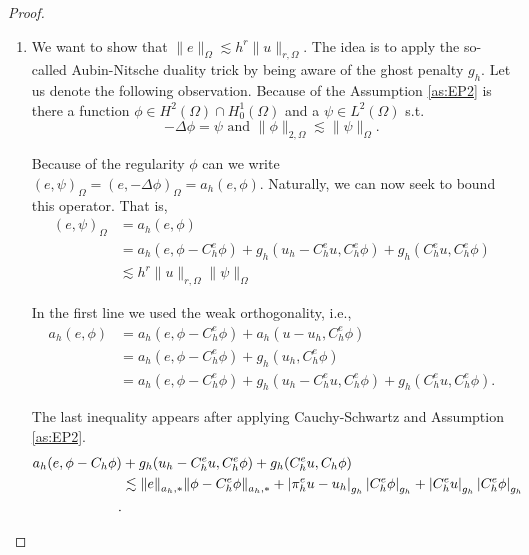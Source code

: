 \begin{proof}
\begin{enumerate}[label=\arabic*)]
    \item We want to show that $ \| e \|_{ \Omega  }^{  } \lesssim   h^{r} \| u \|_{ r,\Omega  }^{  }$. The idea is to apply the so-called Aubin-Nitsche duality trick by being aware of the ghost penalty $g_{h}$. Let us denote the following observation.
    Because of the Assumption \ref{as:EP2} is there a function $\phi \in H^2( \Omega ) \cap H^{1}_{0}( \Omega ) $ and a $\psi \in L^2( \Omega )  $ s.t.
    $$-\Delta \phi = \psi  \text{ and }  \| \phi  \|_{ 2, \Omega  }^{  } \lesssim \| \psi  \|_{ \Omega  }^{  }.$$

    Because of the regularity $\phi $ can we write $ (e, \psi  )_{\Omega } = (e, -\Delta \phi )_{\Omega } = a_{h}(e, \phi )  $. Naturally, we can now seek to bound this operator. That is,
    \[
    \begin{split}
        (e, \psi  )_{\Omega } &= a_{h}( e, \phi ) \\
        &= a_{h}(e, \phi -  C_{h}^{e} \phi   ) + g_{h}(u_{h} - C_{h}^{e} u,   C^{e}_{h} \phi   )  +g_{h}(C^{e} _{h} u, C_{h}^{e} \phi   ) \\
        & \lesssim h^{r} \| u \|_{ r, \Omega  }^{  } \| \psi  \|_{ \Omega  }^{  }
    \end{split}
    \]

    In the first line we used the weak orthogonality, i.e.,
    \[
        \begin{split}
    a_{h}( e, \phi ) & = a_{h}( e, \phi  - C^{e} _{h} \phi ) + a_{h}( u - u_{h}, C^{e} _{h} \phi ) \\
     & = a_{h}( e, \phi  - C^{e} _{h} \phi ) + g_{h}(  u_{h}, C^{e} _{h} \phi ) \\
     & = a_{h}( e, \phi  - C^{e} _{h} \phi ) + g_{h}(  u_{h} - C ^{e}_{h}u, C^{e} _{h} \phi )+ g_{h}( C ^{e}_{h}u, C^{e} _{h} \phi ).
        \end{split}
    \]

    The last inequality appears after applying Cauchy-Schwartz and Assumption \ref{as:EP2}.
\[
    \begin{split}
        a_{h}( e, \phi  - C _{h} \phi ) &+ g_{h}(  u_{h} - C ^{e}_{h}u, C^{e} _{h} \phi )+ g_{h}( C ^{e}_{h}u, C _{h} \phi ) \\
                                          &\lesssim \| e \|_{ a_{h},*  }^{  } \| \phi - C _{h}^{e} \phi   \|_{a_{h},*  }^{  }   +
     \left\lvert \pi _{h}^{e} u - u_{h}  \right\rvert_{ g_{h}}^{  } \left\lvert  C^{e} _{h} \phi   \right\rvert_{g_{h}}+ \left\lvert  C^{e} _{h} u  \right\rvert _{g_{h}} \left\lvert  C^{e} _{h} \phi   \right\rvert_{g_{h}} \\
.
    \end{split}
\]


\end{enumerate}
\end{proof}
